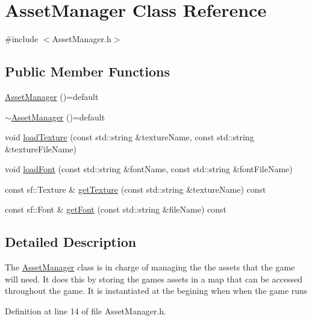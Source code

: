 \hypertarget{class_asset_manager}{}\section{Asset\+Manager Class Reference}
\label{class_asset_manager}


{\ttfamily \#include $<$Asset\+Manager.\+h$>$}

\subsection*{Public Member Functions}
\begin{DoxyCompactItemize}
\item 
\mbox{\hyperlink{class_asset_manager_a48938b146fa7ad19270a11be5363472a}{Asset\+Manager}} ()=default
\item 
\mbox{\hyperlink{class_asset_manager_a4b1639accc9354ac88e9239833b519b7}{$\sim$\+Asset\+Manager}} ()=default
\item 
void \mbox{\hyperlink{class_asset_manager_ae34adbfa6d97e61fb19fa309f07d82b7}{load\+Texture}} (const std\+::string \&texture\+Name, const std\+::string \&texture\+File\+Name)
\item 
void \mbox{\hyperlink{class_asset_manager_a3bfd4095c507124af8cdf16a39f96d6c}{load\+Font}} (const std\+::string \&font\+Name, const std\+::string \&font\+File\+Name)
\item 
const sf\+::\+Texture \& \mbox{\hyperlink{class_asset_manager_a53ef9625536e0d1dba884971036422b5}{get\+Texture}} (const std\+::string \&texture\+Name) const
\item 
const sf\+::\+Font \& \mbox{\hyperlink{class_asset_manager_a48c91cdece398df4831ffdb5b0ce9e46}{get\+Font}} (const std\+::string \&file\+Name) const
\end{DoxyCompactItemize}


\subsection{Detailed Description}
The \mbox{\hyperlink{class_asset_manager}{Asset\+Manager}} class is in charge of managing the the assets that the game will need. It does this by storing the game\textquotesingle{}s assets in a map that can be accessed throughout the game. It is instantiated at the begining when when the game runs 

Definition at line 14 of file Asset\+Manager.\+h.



